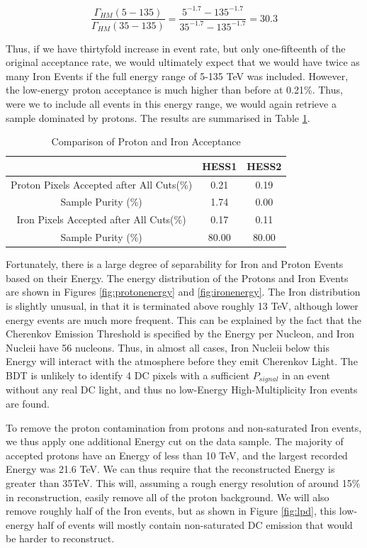 \documentclass[11pt]{article}
\begin{document}
\[ \frac{\Gamma_{HM}(5-135)}{\Gamma_{HM}(35-135)} = \frac{5^{-1.7} - 135^{-1.7}}{35^{-1.7} - 135^{-1.7}} 
= 30.3 \]

Thus, if we have thirtyfold increase in event rate, but only one-fifteenth of the original acceptance rate, we would ultimately expect that we would have twice as many Iron Events if the full energy range of 5-135 TeV was included. However, the low-energy proton acceptance is much higher than before at 0.21\%. Thus, were we to include all events in this energy range, we would again retrieve a sample dominated by protons. The results are summarised in Table \ref{tab:fullironacceptance}. 

\begin{table}[h!]
  \centering
  \caption{Comparison of Proton and Iron Acceptance}
  \label{tab:fullironacceptance}
  \begin{tabular}{ccc}
    \toprule
    & HESS1  & HESS2 \\
    \midrule
    Proton Pixels Accepted after All Cuts(\%) & 0.21 & 0.19\\
    Sample Purity (\%) & 1.74 & 0.00 \\
    \midrule
    Iron Pixels Accepted after All Cuts(\%) & 0.17 & 0.11\\
    Sample Purity (\%) & 80.00 & 80.00 \\
    \bottomrule
  \end{tabular}
\end{table}

Fortunately, there is a large degree of separability for Iron and Proton Events based on their Energy. The energy distribution of the Protons and Iron Events are shown in Figures \ref{fig:protonenergy} and \ref{fig:ironenergy}. The Iron distribution is slightly unusual, in that it is terminated above roughly 13 TeV, although lower energy events are much more frequent. This can be explained by the fact that the Cherenkov Emission Threshold is specified by the Energy per Nucleon, and Iron Nucleii have 56 nucleons. Thus, in almost all cases, Iron Nucleii below this Energy will interact with the atmosphere before they emit Cherenkov Light. The BDT is unlikely to identify 4 DC pixels with a sufficient $P_{signal}$ in an event without any real DC light, and thus no low-Energy High-Multiplicity Iron events are found. 

To remove the proton contamination from protons and non-saturated Iron events, we thus apply one additional Energy cut on the data sample. The majority of accepted protons have an Energy of less than 10 TeV, and the largest recorded Energy was 21.6 TeV. We can thus require that the reconstructed Energy is greater than 35TeV. This will, assuming a rough energy resolution of around 15\% in reconstruction, easily remove all of the proton background. We will also remove roughly half of the Iron events, but as shown in Figure \ref{fig:lpd}, this low-energy half of events will mostly contain non-saturated DC emission that would be harder to reconstruct.
\end{document}
